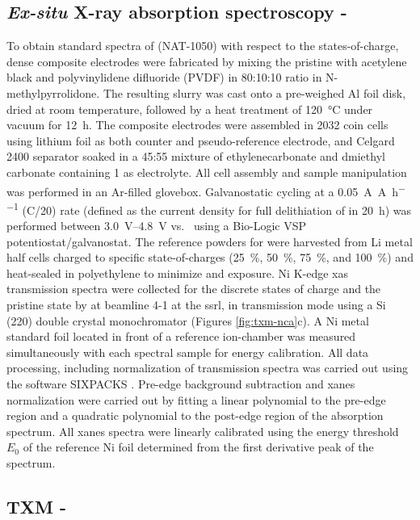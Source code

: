 \documentclass{article}
\begin{document}
\subsection*{\textit{Ex-situ} X-ray absorption spectroscopy - \nca{}}
To obtain standard spectra of \nca{} (NAT-1050) with respect to the
states-of-charge, dense composite electrodes were fabricated by mixing
the pristine \nca{} with acetylene black and polyvinylidene difluoride
(PVDF) in 80:10:10 ratio in N-methylpyrrolidone. The resulting slurry
was cast onto a pre-weighed Al foil disk, dried at room temperature,
followed by a heat treatment of \SI{120}{\celsius} under vacuum for
\SI{12}{\hour}. The composite electrodes were assembled in 2032 coin
cells using lithium foil as both counter and pseudo-reference
electrode, and Celgard 2400 separator soaked in a 45:55 mixture of
ethylenecarbonate and dmiethyl carbonate containing \SI{1}{\molar}
 as electrolyte. All cell assembly and sample manipulation
was performed in an Ar-filled glovebox. Galvanostatic cycling at a
\SI{0.05}{\ampere\per\ampere\per\hour} (C/20) rate (defined as the
current density for full delithiation of \nca{} in \SI{20}{\hour}) was
performed between \SIrange{3.0}{4.8}{\volt} vs.\  using a
Bio-Logic VSP potentiostat/galvanostat. The reference powders for
\nca{} were harvested from Li metal half cells charged to specific
state-of-charges (\SI{25}{\percent}, \SI{50}{\percent},
\SI{75}{\percent}, and \SI{100}{\percent}) and heat-sealed in
polyethylene to minimize  and  exposure. Ni K-edge
\gls{xas} transmission spectra were collected for the discrete states
of charge and the pristine state by at beamline 4-1 at the \gls{ssrl},
in transmission mode using a Si (220) double crystal monochromator
(Figures \ref{fig:txm-nca}c). A Ni metal standard foil located in
front of a reference ion-chamber was measured simultaneously with each
spectral sample for energy calibration. All data processing, including
normalization of transmission spectra was carried out using the
software {SIXPACKS} \cite{lai2011}. Pre-edge background subtraction
and \gls{xanes} normalization were carried out by fitting a linear
polynomial to the pre-edge region and a quadratic polynomial to the
post-edge region of the absorption spectrum. All \gls{xanes} spectra
were linearly calibrated using the energy threshold $E_0$ of the
reference Ni foil determined from the first derivative peak of the
spectrum.


\subsection*{TXM - \nca{}}
\end{document}

